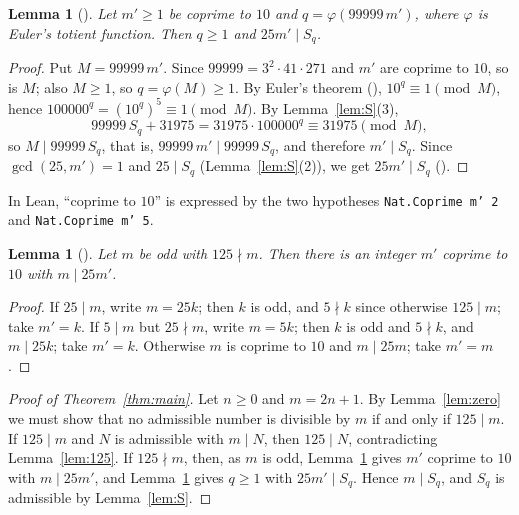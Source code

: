 \documentclass[11pt]{amsart}
\theoremstyle{plain}
\newtheorem{lemma}[theorem]{Lemma}
\theoremstyle{definition}
\begin{document}
\begin{lemma}[]\label{lem:euler}
Let $m'\ge1$ be coprime to $10$ and $q=\varphi(99999\,m')$, where $\varphi$ is Euler's totient function. Then $q\ge1$ and $25m'\mid S_q$.
\end{lemma}

\begin{proof}
Put $M=99999\,m'$. Since $99999=3^2\cdot41\cdot271$ and $m'$ are coprime to $10$, so is $M$; also $M\ge1$, so $q=\varphi(M)\ge1$. By Euler's theorem (), $10^{q}\equiv1\pmod M$, hence $100000^q=(10^q)^5\equiv1\pmod M$. By Lemma~\ref{lem:S}(3),
\[
  99999\,S_q+31975=31975\cdot100000^q\equiv31975\pmod M,
\]
so $M\mid 99999\,S_q$, that is, $99999\,m'\mid99999\,S_q$, and therefore $m'\mid S_q$. Since $\gcd(25,m')=1$ and $25\mid S_q$ (Lemma~\ref{lem:S}(2)), we get $25m'\mid S_q$ ().
\end{proof}

In Lean, ``coprime to $10$'' is expressed by the two hypotheses \texttt{Nat.Coprime m' 2} and \texttt{Nat.Coprime m' 5}.

\begin{lemma}[]\label{lem:cof}
Let $m$ be odd with $125\nmid m$. Then there is an integer $m'$ coprime to $10$ with $m\mid 25m'$.
\end{lemma}

\begin{proof}
If $25\mid m$, write $m=25k$; then $k$ is odd, and $5\nmid k$ since otherwise $125\mid m$; take $m'=k$. If $5\mid m$ but $25\nmid m$, write $m=5k$; then $k$ is odd and $5\nmid k$, and $m\mid 25k$; take $m'=k$. Otherwise $m$ is coprime to $10$ and $m\mid 25m$; take $m'=m$.
\end{proof}

\begin{proof}[Proof of Theorem~\ref{thm:main}]
Let $n\ge0$ and $m=2n+1$. By Lemma~\ref{lem:zero} we must show that no admissible number is divisible by $m$ if and only if $125\mid m$.
If $125\mid m$ and $N$ is admissible with $m\mid N$, then $125\mid N$, contradicting Lemma~\ref{lem:125}.
If $125\nmid m$, then, as $m$ is odd, Lemma~\ref{lem:cof} gives $m'$ coprime to $10$ with $m\mid 25m'$, and Lemma~\ref{lem:euler} gives $q\ge1$ with $25m'\mid S_q$. Hence $m\mid S_q$, and $S_q$ is admissible by Lemma~\ref{lem:S}.
\end{proof}
\end{document}

